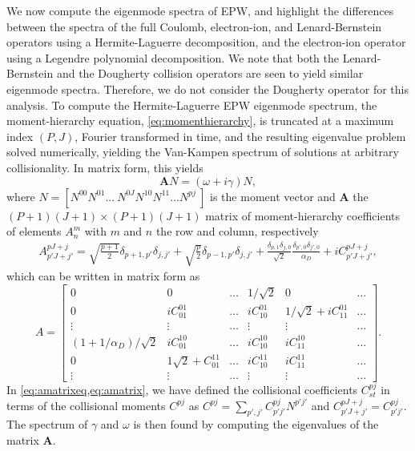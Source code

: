 We now compute the eigenmode spectra of EPW, and highlight the differences between the spectra of the full Coulomb, electron-ion, and Lenard-Bernstein operators using a Hermite-Laguerre decomposition, and the electron-ion operator using a Legendre polynomial decomposition.
%
We note that both the Lenard-Bernstein and the Dougherty collision operators are seen to yield similar eigenmode spectra.
%
Therefore, we do not consider the Dougherty operator for this analysis.
%
To compute the Hermite-Laguerre EPW eigenmode spectrum, the moment-hierarchy equation, \cref{eq:momenthierarchy}, is truncated at a maximum index $(P,J)$, Fourier transformed in time, and the resulting eigenvalue problem solved numerically{, yielding the Van-Kampen spectrum of solutions at arbitrary collisionality}.
%
In matrix form, this yields
%
\begin{equation}
    \mathbf A N = (\omega+i \gamma) N,
\end{equation}
%
where $N = [N^{00} N^{01} ...~N^{0J} N^{10} N^{11} ... N^{pj}~]$ is the moment vector and $\mathbf{A}$ the $(P+1)(J+1)\times (P+1)(J+1)$ matrix of moment-hierarchy coefficients of elements $A^m_n$ with $m$ and $n$ the row and column, respectively
%
{
\begin{align}
    A^{pJ+j}_{p'J+j'}=\sqrt{\frac{p+1}{2}}\delta_{p+1,p'}\delta_{j,j'}+\sqrt{\frac{p}{2}}\delta_{p-1,p'}\delta_{j,j'}+\frac{\delta_{p,1}\delta_{j,0}}{\sqrt{2}}\frac{\delta_{p',0}\delta_{j',0}}{\alpha_D}+iC^{pJ+j}_{p'J+j'},
\label{eq:amatrixeq}
\end{align}
}
%
{which can be written in matrix form as}
%
\begin{equation}
    A = \begin{bmatrix} 
    0                         & 0                      & \dots & 1/\sqrt{2} & 0                       & \dots \\
    0                         &i C_{01}^{01}            & \dots &i C_{10}^{01} & 1/\sqrt{2}+iC_{11}^{01} & \dots \\
    \vdots                    & \vdots                 & \dots & \vdots      & \vdots      & \dots \\
    (1+1/\alpha_D)/\sqrt{2} & iC_{01}^{10}            & \dots & iC_{10}^{10} & iC_{11}^{10} & \dots \\
    0                         & 1\sqrt{2}+C_{01}^{11} & \dots &i C_{10}^{11} & iC_{11}^{11} & \dots \\
    \vdots                    & \vdots                 & \dots & \vdots      & \vdots      & \dots 
    \end{bmatrix}.
\label{eq:amatrix}
\end{equation}
%
In \cref{eq:amatrixeq,eq:amatrix}, we have defined the collisional coefficients $C^{pj}_{st}$ in terms of the collisional moments $C^{pj}$ as $C^{pj}=\sum_{p',j'}C^{pj}_{p'j'}N^{p'j'}$ and $C^{pJ+j}_{p'J+j'}=C^{pj}_{p'j'}$.
%
The spectrum of $\gamma$ and $\omega$ is then found by computing the eigenvalues of the matrix $\mathbf A$.

